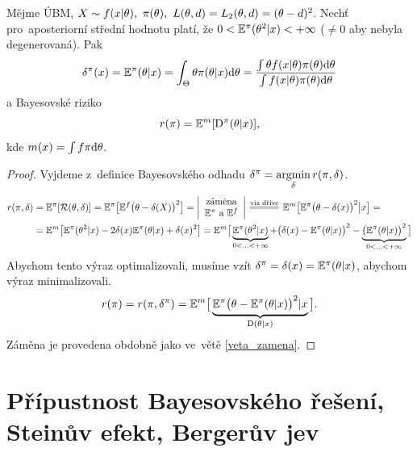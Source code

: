 \begin{theorem}[!!!Vyhazovací!!!]\label{vyhazovaci}
	Mějme ÚBM, $X\sim f(x|\theta),~\pi(\theta),~L(\theta,d)=L_2(\theta,d)=(\theta-d)^2$. Nechť pro~aposteriorní střední hodnotu platí, že $0<\mathbb{E}^\pi(\theta^2|x)<+\infty$ ($\neq 0$ aby nebyla degenerovaná). Pak $$\delta^\pi(x)=\mathbb{E}^\pi(\theta|x)=\int_\Theta \theta\pi(\theta| x)\mathrm{d}\theta=\frac{\int\theta f(x|\theta)\pi(\theta)\mathrm{d}\theta}{\int f(x|\theta)\pi(\theta)\mathrm{d}\theta}$$
	a Bayesovské riziko 
	$$r(\pi)=\mathbb{E}^m[\mathrm{D}^\pi(\theta|x)],$$
	kde $m(x)=\int f\pi\mathrm{d}\theta$.
	\begin{proof}
		Vyjdeme z~definice Bayesovského odhadu $\delta^\pi=\mathop{\mathrm{argmin}}\limits_{\delta} r(\pi,\delta)$.
		\[
		\begin{split}
		r(\pi,\delta)&=\E^\pi[\RF(\t,\delta)]=\E^\pi\big[\E^f\big(\t-\delta(X)\big)^2\big]=\left|\begin{array}{c}
		\text{záměna} \\ \E^\pi\text{ a~}\E^f		
		\end{array}
		\right|\equal{\text{viz dříve}}\E^m\big[\E^\pi\big(\t-\delta(x)\big)^2\big|x\big]=\\&=\E^m\big[\E^\pi(\t^2|x)-2\delta(x)\E^\pi(\t|x)+\delta(x)^2\big]=\E^m\big[\underbrace{\E^\pi(\t^2|x)}_{0<...<+\infty}+\big(\delta(x)-\E^\pi(\t|x)\big)^2-\underbrace{\big(\E^\pi(\t|x)\big)^2}_{0<...<+\infty}\big]
		\end{split}
		\] Abychom tento výraz optimalizovali, musíme vzít $\delta^{\pi}=\delta(x)=\mathbb{E}^\pi(\theta|x)$, abychom výraz minimalizovali.
		$$ r(\pi)=r(\pi,\delta^\pi)=\mathbb{E}^m\big[\underbrace{\mathbb{E}^\pi\big(\theta-\mathbb{E}^\pi(\theta|x)\big)^2|x}_{\mathrm{D}(\theta|x)}\big].$$
		Záměna je provedena obdobně jako ve~větě \ref{veta_zamena}.
	\end{proof}
\end{theorem}

\chapter{Přípustnost Bayesovského řešení, Steinův efekt, Bergerův jev}

